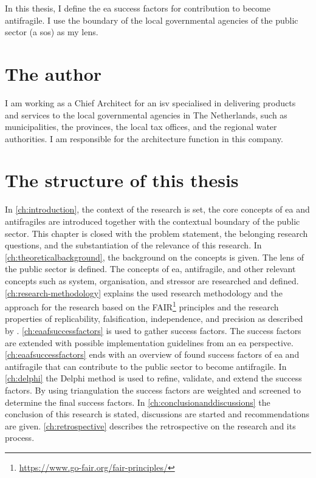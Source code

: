 In this thesis, I define the \acrfull{ea} success factors for contribution to become \gls{antifragile}. I use the boundary of the local governmental agencies of the public sector (a \acrlong{sos}) as my lens.

\section{The author}
\label{sec:context}
I am working as a Chief Architect for an \acrfull{isv} specialised in delivering products and services to the local governmental agencies in The Netherlands, such as municipalities, the provinces, the local tax offices, and the regional water authorities. I am responsible for the architecture function in this company.

\section{The structure of this thesis}
\label{sec:structure}
In \cref{ch:introduction}, the context of the research is set, the core concepts of \acrshort{ea} and \glspl{antifragile} are introduced together with the contextual boundary of the public sector. This chapter is closed with the problem statement, the belonging research questions, and the substantiation of the relevance of this research. In \cref{ch:theoreticalbackground}, the background on the concepts is given. The lens of the public sector is defined. The concepts of \acrshort{ea}, \gls{antifragile}, and other relevant concepts such as system, organisation, and stressor are researched and defined. \cref{ch:research-methodology} explains the used research methodology and the approach for the research based on the FAIR\footnote{\url{https://www.go-fair.org/fair-principles/}} principles and the research properties of replicability, falsification, independence, and precision as described by \textcite{Recker2013}. \cref{ch:eaafsuccessfactors} is used to gather success factors. The success factors are extended with possible implementation guidelines from an \acrshort{ea} perspective. \cref{ch:eaafsuccessfactors} ends with an overview of found success factors of \acrshort{ea} and \gls{antifragile} that can contribute to the public sector to become \gls{antifragile}. In \cref{ch:delphi} the Delphi method is used to refine, validate, and extend the success factors. By using triangulation the success factors are weighted and screened to determine the final success factors. In \cref{ch:conclusionanddiscussions} the conclusion of this research is stated, discussions are started and recommendations are given. \cref{ch:retrospective} describes the retrospective on the research and its process.

